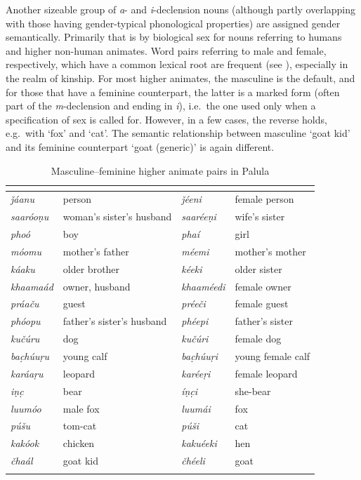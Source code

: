 \documentclass[output=collectionpaper]{langsci/langscibook}
\begin{document}
Another sizeable group of \textit{a}{}- and \textit{i}{}-declension nouns (although partly overlapping with those having gender-typical phonological properties) are assigned gender semantically. Primarily that is by biological sex for nouns referring to humans and higher non-human animates. Word pairs referring to male and female, respectively, which have a common lexical root are frequent (see ), especially in the realm of kinship. For most higher animates, the masculine is the default, and for those that have a feminine counterpart, the latter is a marked form (often part of the \textit{m}{}-declension and ending in \textit{i}), i.e.\ the one used only when a specification of sex is called for. However, in a few cases, the reverse holds, e.g.\ with `fox' and `cat'. The semantic relationship between masculine `goat kid' and its feminine counterpart `goat (generic)' is again different.

\begin{table}[htb]
\begin{tabularx}{\textwidth}{>{\itshape}l>{\raggedright\let\newline\\\arraybackslash\hspace{0pt}}X>{\itshape}l>{\raggedright\let\newline\\\arraybackslash\hspace{0pt}}X}
\lsptoprule
\multicolumn{2}{X}{\normalfont Masculine} & \multicolumn{2}{X}{\normalfont Feminine}\\
\midrule
ǰáanu & person & ǰéeni & female person\\
saaróoṇu & woman's sister's husband & saaréeṇi & wife's sister\\
phoó & boy & phaí & girl\\
móomu & mother's father & méemi & mother's mother\\
káaku & older brother & kéeki & older sister\\
khaamaád & owner, husband & khaaméedi & female owner\\
práaču & guest & préeči & female guest\\
phóopu & father's sister's husband & phéepi & father's sister\\
kučúru & dog & kučúri & female dog\\
bac̣húuṛu & young calf & bac̣húuṛi & young female calf\\
karáaṛu & leopard & karéeṛi & female leopard\\
iṇc̣ & bear & íṇc̣i & she-bear\\
luumóo & male fox & luumái & fox\\
púšu & tom-cat & púši & cat\\
kakóok & chicken & kakuéeki & hen\\
čhaál & goat kid & čhéeli & goat\\
\lspbottomrule
\end{tabularx}
\caption{Masculine--feminine higher animate pairs in Palula}
\label{tab:Lilje:9}
\end{table}
\end{document}
